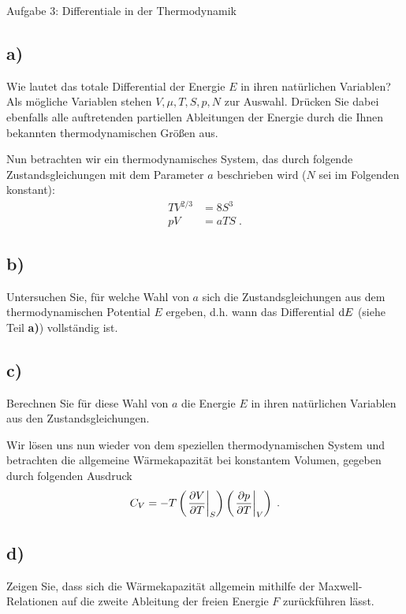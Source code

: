 \begin{aufgabe}{Aufgabe 3: Differentiale in der Thermodynamik}
    \subsection{a)}
    Wie lautet das totale Differential der Energie $E$ in ihren natürlichen Variablen?
    Als mögliche Variablen stehen $V, \mu, T, S, p, N$ zur Auswahl.
    Drücken Sie dabei ebenfalls alle auftretenden partiellen Ableitungen der Energie durch die Ihnen bekannten thermodynamischen Größen aus.


    Nun betrachten wir ein thermodynamisches System, das durch folgende Zustandsgleichungen mit dem Parameter $a$ beschrieben wird ($N$ sei im Folgenden konstant):
    \begin{align}
        TV^{2/3} &= 8S^3 \\
        pV &= aTS \;.
    \end{align}

    \subsection{b)}
    Untersuchen Sie, für welche Wahl von $a$ sich die Zustandsgleichungen aus dem thermodynamischen Potential $E$ ergeben, d.h. wann das Differential $\mathrm{d} E$ (siehe Teil \textbf{a)}) vollständig ist.

    \subsection{c)}
    Berechnen Sie für diese Wahl von $a$ die Energie $E$ in ihren natürlichen Variablen aus den Zustandsgleichungen.


    Wir lösen uns nun wieder von dem speziellen thermodynamischen System und betrachten die allgemeine Wärmekapazität bei konstantem Volumen, gegeben durch folgenden Ausdruck
    \[
        C_V = -T \left(\left.\frac{\partial V}{\partial T}\right\rvert_{S}\right) \left(\left.\frac{\partial p}{\partial T}\right\rvert_{V}\right) \;.
    \]

    \subsection{d)}
    Zeigen Sie, dass sich die Wärmekapazität allgemein mithilfe der Maxwell-Relationen auf die zweite Ableitung der freien Energie $F$ zurückführen lässt.

\end{aufgabe}

